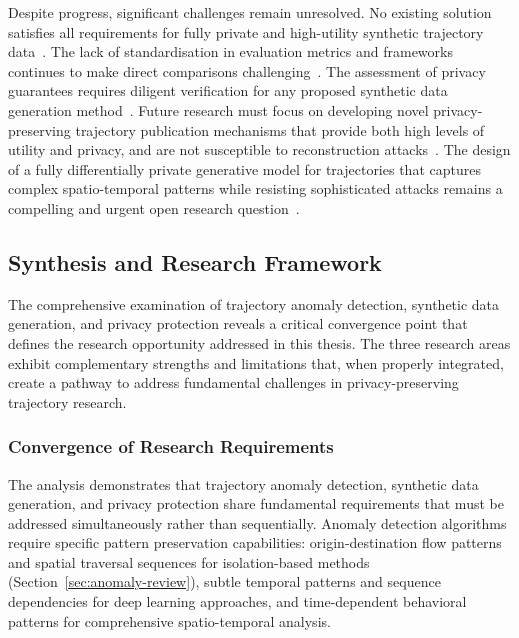 \documentclass[runningheads]{llncs}
\begin{document}
Despite progress, significant challenges remain unresolved. No existing solution satisfies all requirements for fully private and high-utility synthetic trajectory data~\cite{buchholzSystematisationKnowledgeTrajectory2024}. The lack of standardisation in evaluation metrics and frameworks continues to make direct comparisons challenging~\cite{primaultLongRoadComputational2019,jinSurveyExperimentalStudy2023}. The assessment of privacy guarantees requires diligent verification for any proposed synthetic data generation method~\cite{buchholzSystematisationKnowledgeTrajectory2024}. Future research must focus on developing novel privacy-preserving trajectory publication mechanisms that provide both high levels of utility and privacy, and are not susceptible to reconstruction attacks~\cite{buchholzReconstructionAttackDifferential2022,buchholzSystematisationKnowledgeTrajectory2024,primaultLongRoadComputational2019}. The design of a fully differentially private generative model for trajectories that captures complex spatio-temporal patterns while resisting sophisticated attacks remains a compelling and urgent open research question~\cite{buchholzSystematisationKnowledgeTrajectory2024,buchholzReconstructionAttackDifferential2022}.

\subsection{Synthesis and Research Framework}
\label{sec:synthesis}

The comprehensive examination of trajectory anomaly detection, synthetic data generation, and privacy protection reveals a critical convergence point that defines the research opportunity addressed in this thesis. The three research areas exhibit complementary strengths and limitations that, when properly integrated, create a pathway to address fundamental challenges in privacy-preserving trajectory research.

\subsubsection{Convergence of Research Requirements}

The analysis demonstrates that trajectory anomaly detection, synthetic data generation, and privacy protection share fundamental requirements that must be addressed simultaneously rather than sequentially. Anomaly detection algorithms require specific pattern preservation capabilities: origin-destination flow patterns and spatial traversal sequences for isolation-based methods (Section~\ref{sec:anomaly-review}), subtle temporal patterns and sequence dependencies for deep learning approaches, and time-dependent behavioral patterns for comprehensive spatio-temporal analysis.
\end{document}
